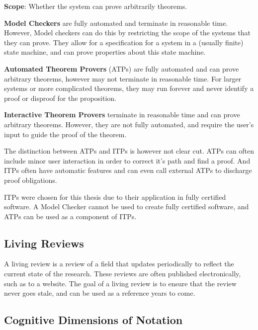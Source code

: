 \documentclass[
]{article}
\begin{document}
\textbf{Scope}: Whether the system can prove arbitrarily theorems.

\textbf{Model Checkers} are fully automated and terminate in reasonable
time. However, Model checkers can do this by restricting the scope of
the systems that they can prove. They allow for a specification for a
system in a (usually finite) state machine, and can prove properties
about this state machine.

\textbf{Automated Theorem Provers} (ATPs) are fully automated and can
prove arbitrary theorems, however may not terminate in reasonable time.
For larger systems or more complicated theorems, they may run forever
and never identify a proof or disproof for the proposition.

\textbf{Interactive Theorem Provers} terminate in reasonable time and
can prove arbitrary theorems. However, they are not fully automated, and
require the user's input to guide the proof of the theorem.

The distinction between ATPs and ITPs is however not clear cut. ATPs can
often include minor user interaction in order to correct it's path and
find a proof. And ITPs often have automatic features and can even call
external ATPs to discharge proof obligations.

ITPs were chosen for this thesis due to their application in fully
certified software. A Model Checker cannot be used to create fully
certified software, and ATPs can be used as a component of ITPs.

\hypertarget{sec:living_review}{%
\subsection{Living Reviews}\label{sec:living_review}}

A living review is a review of a field that updates periodically to
reflect the current state of the research. These reviews are often
published electronically, such as to a website. The goal of a living
review is to ensure that the review never goes stale, and can be used as
a reference years to come.

\hypertarget{cognitive-dimensions-of-notation}{%
\subsection{Cognitive Dimensions of
Notation}\label{cognitive-dimensions-of-notation}}
\end{document}
